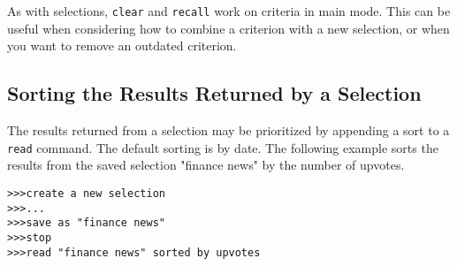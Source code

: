 As with selections, \texttt{clear} and \texttt{recall} work on criteria in main mode. This can be useful when
considering how to combine a criterion with a new selection, or when you want to remove an
outdated criterion.

\subsection{Sorting the Results Returned by a Selection}
The results returned from a selection may be prioritized by appending a sort to a \texttt{read} command.
The default sorting is by date. The following example sorts the results from the saved selection
"finance news" by the number of upvotes.
\newline\begin{minipage}{\linewidth}\begin{lstlisting}
>>>create a new selection
>>>...
>>>save as "finance news"
>>>stop
>>>read "finance news" sorted by upvotes
\end{lstlisting}\end{minipage}
